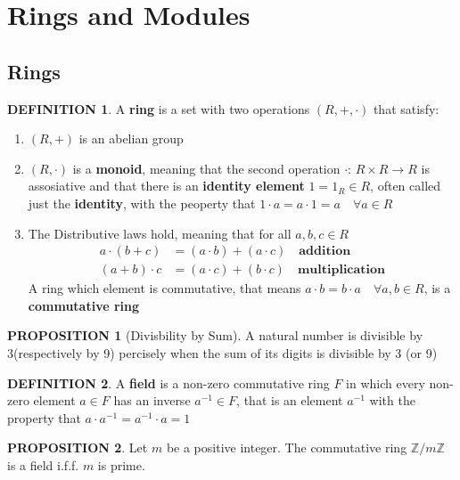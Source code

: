 \documentclass[10pt]{article}
\theoremstyle{definition}
\newtheorem{definition}{DEFINITION}[subsection]
\newtheorem{prop}{PROPOSITION}[subsection]
\begin{document}
\section{Rings and Modules}
\subsection{Rings}
\begin{definition}
    A \textbf{ring} is a set with two operations $(R,+,\cdot)$ that satisfy:
    \begin{enumerate}
        \item $(R,+)$ is an abelian group
        \item $(R,\cdot)$ is a \textbf{monoid}, meaning that the second operation $\cdot$: $R\times R\rightarrow R$ is assosiative and that there is an \textbf{identity element} $1 = 1_R \in R$, often called just the \textbf{identity}, with the peoperty that $1\cdot a = a \cdot 1 = a \quad\forall a \in R$
        \item The Distributive laws hold, meaning that for all $a,b,c \in R$ \[\begin{split}
            a\cdot (b+c) &= (a\cdot b)+(a \cdot c)\quad \textbf{addition}\\
            (a+b) \cdot c &= (a \cdot c) + (b \cdot c) \quad \textbf{multiplication}
        \end{split}\]
    A ring which element is commutative, that means $a \cdot b = b \cdot a \quad \forall a,b \in R$, is a \textbf{commutative ring}
    \end{enumerate}
\end{definition}

\begin{prop}[Divisbility by Sum]
    A natural number is divisible by 3(respectively by 9) percisely when the sum of its digits is divisible by 3 (or 9)
\end{prop}

\begin{definition}
    A \textbf{field} is a non-zero commutative ring $F$ in which every non-zero element $a\in F$ has an inverse $a^{-1} \in F$, that is an element $a^{-1}$ with the property that $a\cdot a^{-1} = a^{-1}\cdot a = 1$
\end{definition}

\begin{prop}
    Let $m$ be a positive integer. The commutative ring $\mathbb{Z}/m\mathbb{Z}$ is a field i.f.f. $m$ is prime.
\end{prop}
\end{document}
